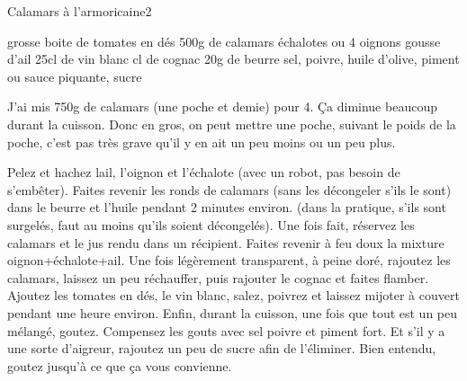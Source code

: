 \begin{recette}{Calamars à l'armoricaine}{2}{}{}
\begin{ingredients}
 grosse boite de tomates en dés
\ingredient 500g de calamars
 échalotes
 ou 4 oignons
 gousse d'ail
\ingredient 25cl de vin blanc
 cl de cognac
\ingredient 20g de beurre
\ingredient sel, poivre, huile d'olive, piment ou sauce piquante, sucre
\end{ingredients}

\begin{remarque}
J'ai mis 750g de calamars (une poche et demie) pour 4. Ça diminue beaucoup durant la cuisson. Donc en gros, on peut mettre une poche, suivant le poids de la poche, c'est pas très grave qu'il y en ait un peu moins ou un peu plus.
\end{remarque}


\begin{preparation}
\etape Pelez et hachez lail, l'oignon et l'échalote (avec un robot, pas besoin de s'embêter).
\etape Faites revenir les ronds de calamars (sans les décongeler s'ils le sont) dans le beurre et l'huile pendant 2 minutes environ. (dans la pratique, s'ils sont surgelés, faut au moins qu'ils soient décongelés). Une fois fait, réservez les calamars et le jus rendu dans un récipient.
\etape Faites revenir à feu doux la mixture oignon+échalote+ail. 
\etape Une fois légèrement transparent, à peine doré, rajoutez les calamars, laissez un peu réchauffer, puis rajouter le cognac et faites flamber.
\etape Ajoutez les tomates en dés, le vin blanc, salez, poivrez et laissez mijoter à couvert pendant une heure environ.
\etape Enfin, durant la cuisson, une fois que tout est un peu mélangé, goutez. Compensez les gouts avec sel poivre et piment fort. Et s'il y a une sorte d'aigreur, rajoutez un peu de sucre afin de l'éliminer. Bien entendu, goutez jusqu'à ce que ça vous convienne.
\end{preparation}

\end{recette}

